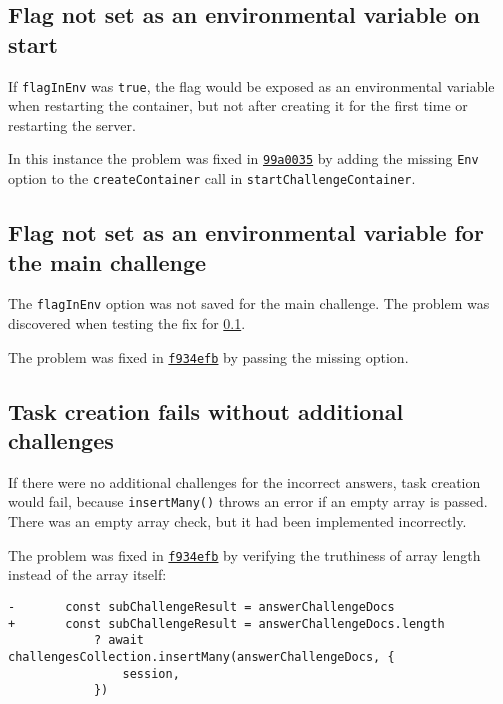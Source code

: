 \subsection{Flag not set as an environmental variable on start}
\label{chap:bug-env-not-set-start}

If \texttt{flagInEnv} was \texttt{true}, the flag would be exposed as an environmental variable when restarting the container, but not after creating it for the first time or restarting the server.

In this instance the problem was fixed in \href{https://github.com/krzysdz/inz/commit/99a0035c61de55ddd7203e7ced1e9fc554959f24}{\texttt{99a0035}} by adding the missing \texttt{Env} option to the \texttt{createContainer} call in \texttt{startChallengeContainer}.

\subsection{Flag not set as an environmental variable for the main challenge}

The \texttt{flagInEnv} option was not saved for the main challenge. The problem was discovered when testing the fix for \ref{chap:bug-env-not-set-start}.

The problem was fixed in \href{https://github.com/krzysdz/inz/commit/f934efb0c50f0156d73bd78fcfcd6a12b5943b1e}{\texttt{f934efb}} by passing the missing option.

\subsection{Task creation fails without additional challenges}

If there were no additional challenges for the incorrect answers, task creation would fail, because \texttt{insertMany()} throws an error if an empty array is passed. There was an empty array check, but it had been implemented incorrectly.

The problem was fixed in \href{https://github.com/krzysdz/inz/commit/f934efb0c50f0156d73bd78fcfcd6a12b5943b1e}{\texttt{f934efb}} by verifying the truthiness of array length instead of the array itself:
\begin{verbatim}
-		const subChallengeResult = answerChallengeDocs
+		const subChallengeResult = answerChallengeDocs.length
			? await challengesCollection.insertMany(answerChallengeDocs, {
				session,
			})
\end{verbatim}

